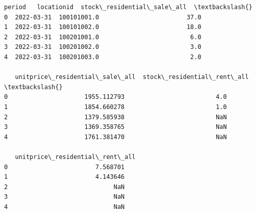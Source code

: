 \documentclass[11pt]{article}
\makeatletter
\newcommand{\boxspacing}{\kern\kvtcb@left@rule\kern\kvtcb@boxsep}
\newcommand{\prompt}[4]{
        {\ttfamily\llap{{\color{#2}[#3]:\hspace{3pt}#4}}\vspace{-\baselineskip}}
    }
\makeatother
\begin{document}
            \begin{tcolorbox}[breakable, size=fbox, boxrule=.5pt, pad at break*=1mm, opacityfill=0]
\prompt{Out}{outcolor}{34}{\boxspacing}
\begin{Verbatim}[commandchars=\\\{\}]
       period   locationid  stock\_residential\_sale\_all  \textbackslash{}
0  2022-03-31  100101001.0                        37.0
1  2022-03-31  100101002.0                        18.0
2  2022-03-31  100201001.0                         6.0
3  2022-03-31  100201002.0                         3.0
4  2022-03-31  100201003.0                         2.0

   unitprice\_residential\_sale\_all  stock\_residential\_rent\_all  \textbackslash{}
0                     1955.112793                         4.0
1                     1854.660278                         1.0
2                     1379.585938                         NaN
3                     1369.358765                         NaN
4                     1761.381470                         NaN

   unitprice\_residential\_rent\_all
0                        7.568701
1                        4.143646
2                             NaN
3                             NaN
4                             NaN
\end{Verbatim}
\end{tcolorbox}
        
\end{document}
